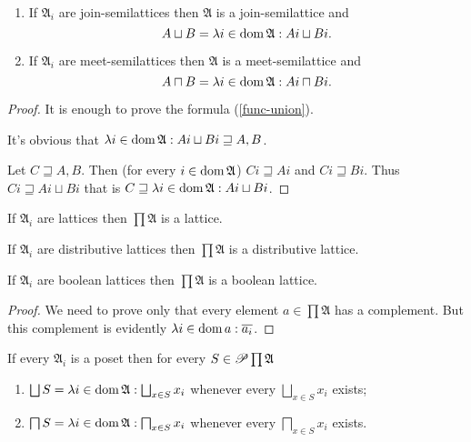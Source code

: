 \begin{prop}
~
\begin{enumerate}
\item If $\mathfrak{A}_{i}$ are join-semilattices then $\mathfrak{A}$
is a join-semilattice and
\begin{equation}
A\sqcup B=\lambda i\in\operatorname{dom}\mathfrak{A}:Ai\sqcup Bi.\label{func-union}
\end{equation}

\item If $\mathfrak{A}_{i}$ are meet-semilattices then $\mathfrak{A}$
is a meet-semilattice and
\[
A\sqcap B=\lambda i\in\operatorname{dom}\mathfrak{A}:Ai\sqcap Bi.
\]

\end{enumerate}
\end{prop}
\begin{proof}
It is enough to prove the formula (\ref{func-union}).

It's obvious that $\lambda i\in\operatorname{dom}\mathfrak{A}:Ai\sqcup Bi\sqsupseteq A,B$.

Let $C\sqsupseteq A,B$. Then (for every $i\in\operatorname{dom}\mathfrak{A}$)
$Ci\sqsupseteq Ai$ and $Ci\sqsupseteq Bi$. Thus $Ci\sqsupseteq Ai\sqcup Bi$
that is $C\sqsupseteq\lambda i\in\operatorname{dom}\mathfrak{A}:Ai\sqcup Bi$.\end{proof}
\begin{cor}
If $\mathfrak{A}_{i}$ are lattices then $\prod\mathfrak{A}$ is a lattice.\end{cor}
\begin{obvious}
If $\mathfrak{A}_{i}$ are distributive lattices then $\prod\mathfrak{A}$
is a distributive lattice.\end{obvious}
\begin{prop}
If $\mathfrak{A}_{i}$ are boolean lattices then $\prod\mathfrak{A}$
is a boolean lattice.\end{prop}
\begin{proof}
We need to prove only that every element $a\in\prod\mathfrak{A}$
has a complement. But this complement is evidently $\lambda i\in\operatorname{dom} a:\overline{a_{i}}$.\end{proof}
\begin{prop}\label{cw-join}
If every $\mathfrak{A}_{i}$ is a poset then for every $S\in\mathscr{P}\prod\mathfrak{A}$
\begin{enumerate}
\item $\bigsqcup S=\mylambda i{\dom\mathfrak{A}}{\bigsqcup_{x\in S}x_{i}}$
whenever every $\bigsqcup_{x\in S}x_{i}$ exists;
\item $\bigsqcap S=\lambda i\in\operatorname{dom}\mathfrak{A}:\bigsqcap_{x\in S}x_{i}$
whenever every $\bigsqcap_{x\in S}x_{i}$ exists.
\end{enumerate}
\end{prop}
